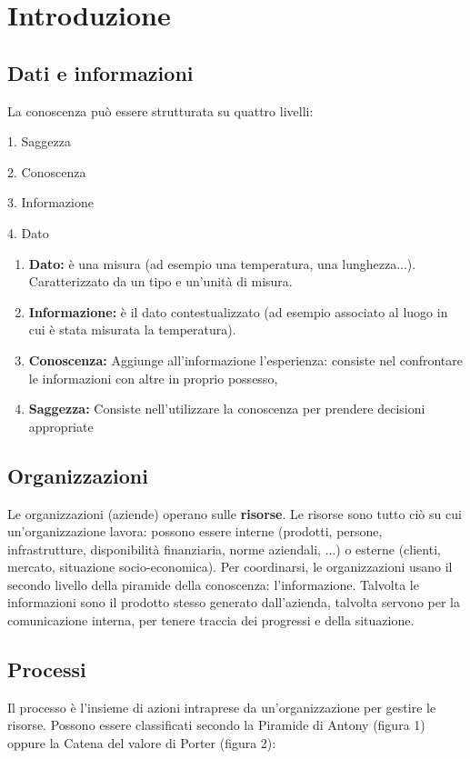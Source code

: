 \documentclass[\main/main.tex]{subfiles}
\begin{document}
\section{Introduzione}
\subsection{Dati e informazioni}
La conoscenza può essere strutturata su quattro livelli:

\begin{center}
  1. Saggezza

  2. Conoscenza

  3. Informazione

  4. Dato
\end{center}


\begin{enumerate}
  \item \textbf{Dato:} è una misura (ad esempio una temperatura, una lunghezza...). Caratterizzato da un tipo e un'unità di misura.
  \item \textbf{Informazione:} è il dato contestualizzato (ad esempio associato al luogo in cui è stata misurata la temperatura).
  \item \textbf{Conoscenza:} Aggiunge all'informazione l'esperienza: consiste nel confrontare le informazioni con altre in proprio possesso,
  \item \textbf{Saggezza:} Consiste nell'utilizzare la conoscenza per prendere decisioni appropriate
\end{enumerate}

\subsection{Organizzazioni}
Le organizzazioni (aziende) operano sulle \textbf{risorse}. Le risorse sono tutto ciò su cui un'organizzazione lavora: possono essere interne (prodotti, persone, infrastrutture, disponibilità finanziaria, norme aziendali, ...) o esterne (clienti, mercato, situazione socio-economica).
Per coordinarsi, le organizzazioni usano il secondo livello della piramide della conoscenza: l'informazione. Talvolta le informazioni sono il prodotto stesso generato dall'azienda, talvolta servono per la comunicazione interna, per tenere traccia dei progressi e della situazione.

\subsection{Processi}
Il processo è l'insieme di azioni intraprese da un'organizzazione per gestire le risorse.
Possono essere classificati secondo la Piramide di Antony (figura 1) oppure la Catena del valore di Porter (figura 2):
\end{document}
